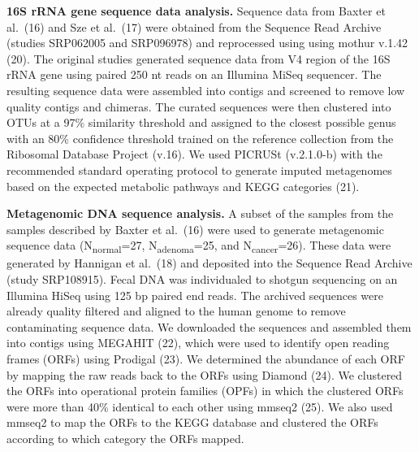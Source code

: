 \documentclass[11pt,]{article}
\begin{document}
\textbf{16S rRNA gene sequence data analysis.} Sequence data from Baxter
et al.~(16) and Sze et al.~(17) were obtained from the Sequence Read
Archive (studies SRP062005 and SRP096978) and reprocessed using using
mothur v.1.42 (20). The original studies generated sequence data from V4
region of the 16S rRNA gene using paired 250 nt reads on an Illumina
MiSeq sequencer. The resulting sequence data were assembled into contigs
and screened to remove low quality contigs and chimeras. The curated
sequences were then clustered into OTUs at a 97\% similarity threshold
and assigned to the closest possible genus with an 80\% confidence
threshold trained on the reference collection from the Ribosomal
Database Project (v.16). We used PICRUSt (v.2.1.0-b) with the
recommended standard operating protocol to generate imputed metagenomes
based on the expected metabolic pathways and KEGG categories (21).

\textbf{Metagenomic DNA sequence analysis.} A subset of the samples from
the samples described by Baxter et al.~(16) were used to generate
metagenomic sequence data (N\textsubscript{normal}=27,
N\textsubscript{adenoma}=25, and N\textsubscript{cancer}=26). These data
were generated by Hannigan et al.~(18) and deposited into the Sequence
Read Archive (study SRP108915). Fecal DNA was individualed to shotgun
sequencing on an Illumina HiSeq using 125 bp paired end reads. The
archived sequences were already quality filtered and aligned to the
human genome to remove contaminating sequence data. We downloaded the
sequences and assembled them into contigs using MEGAHIT (22), which were
used to identify open reading frames (ORFs) using Prodigal (23). We
determined the abundance of each ORF by mapping the raw reads back to
the ORFs using Diamond (24). We clustered the ORFs into operational
protein families (OPFs) in which the clustered ORFs were more than 40\%
identical to each other using mmseq2 (25). We also used mmseq2 to map
the ORFs to the KEGG database and clustered the ORFs according to which
category the ORFs mapped.
\end{document}
